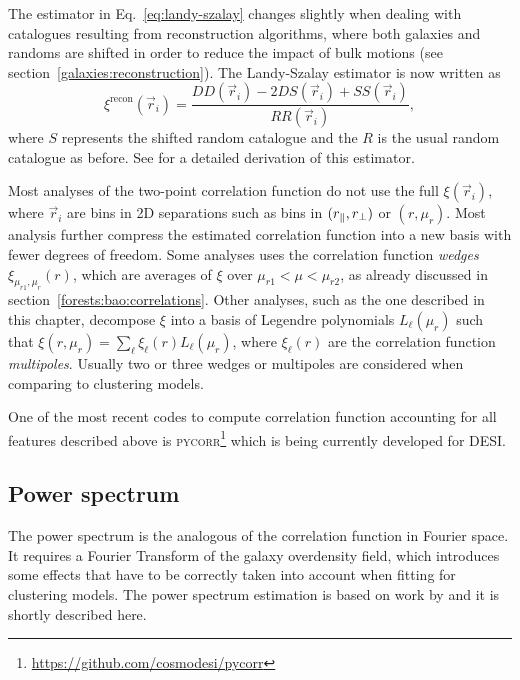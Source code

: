 The estimator in Eq.~\ref{eq:landy-szalay} changes slightly when dealing with catalogues 
resulting from reconstruction algorithms,
where both galaxies and randoms are shifted in order to reduce the impact of bulk motions 
(see section~\ref{galaxies:reconstruction}). 
The Landy-Szalay estimator is now written as  
\begin{equation}
    \xi^\text{recon}(\vec{r}_i) = \frac{DD(\vec{r}_i) - 2DS(\vec{r}_i) + SS(\vec{r}_i)}{RR(\vec{r}_i)},
    \label{eq:landy-szalay-recon}
\end{equation}
where $S$ represents the shifted random catalogue and the $R$ is the usual random catalogue as before. 
See \cite{padmanabhanReconstructingBaryonOscillations2009, padmanabhanCentDistance352012} 
for a detailed derivation of this estimator. 

Most analyses of the two-point correlation function do not use the full $\xi(\vec{r}_i)$,
where $\vec{r}_i$ are bins in 2D separations such as bins in $({r_\parallel}, {r_\perp})$ or $(r, \mu_r)$.
Most analysis further compress the estimated correlation function into a new basis with fewer 
degrees of freedom. Some analyses uses the correlation function 
\emph{wedges} $\xi_{\mu_{r1}, \mu_{r}}(r)$, which are 
averages of $\xi$ over $\mu_{r1} < \mu < \mu_{r2}$, as already discussed in section~\ref{forests:bao:correlations}. 
Other analyses, such as the one described in this chapter, decompose $\xi$ into a basis of 
Legendre polynomials $L_\ell(\mu_r)$ such that $\xi(r, \mu_r) = \sum_\ell \xi_\ell(r) L_\ell(\mu_r)$, 
where $\xi_\ell(r)$ are the correlation function \emph{multipoles}. 
Usually two or three wedges or multipoles are considered when comparing to clustering models.  

One of the most recent codes to compute correlation function accounting for all 
features described above is 
\textsc{pycorr}\footnote{\url{https://github.com/cosmodesi/pycorr}} 
which is being currently developed for DESI.

\subsection{Power spectrum}
\label{galaxies:clustering:power_spectrum}

The power spectrum is the analogous of the correlation function in Fourier space. 
It requires a Fourier Transform of the galaxy overdensity field, which introduces 
some effects that have to be correctly taken into account when fitting for clustering models. 
The power spectrum estimation is based on work by 
\cite{feldmanPowerSpectrumAnalysisThreedimensional1994,
bianchiMeasuringLineofsightdependentFourierspace2015,
handOptimalFFTbasedAnisotropic2017} and it is shortly described here. 

